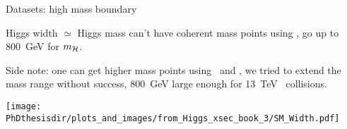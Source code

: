 \begin{frame}{Datasets: high mass boundary}

\begin{minipage}[c]{.52\textwidth}
\manip Higgs width $\simeq$ Higgs mass 
\submanip can't have coherent mass points using \higgsML,
\submanip go up to \SI{800}{\GeV} for $m_{\mathcal{H}}$.

\manip Side note:
\submanip one can get higher mass points using \Higgs\ and \HiggsA,
\submanip we tried to extend the mass range without success,
\submanip \SI{800}{\GeV} large enough for \SI{13}{\TeV} \proton\proton\ collisions.
\end{minipage}
\hfill
\begin{minipage}[c]{.45\textwidth}
\vspace{-\baselineskip}
\begin{center}
\texttt{[image: \\PhDthesisdir/plots\_and\_images/from\_Higgs\_xsec\_book\_3/SM\_Width.pdf]}
\end{center}
\end{minipage}

\end{frame}

